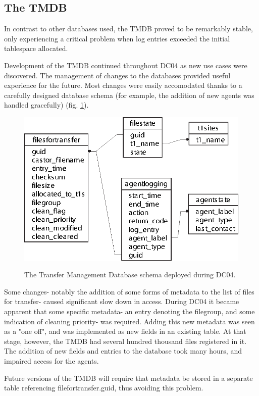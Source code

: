 \documentclass{cmspaper}
\begin{document}
\subsection{The TMDB}
In contrast to other databases used, the TMDB proved to be remarkably stable, only experiencing a critical problem when log entries exceeded the initial tablespace allocated.

Development of the TMDB continued throughout DC04 as new use cases were discovered. The management of changes to the databases provided useful experience for the future. Most changes were easily accomodated thanks to a carefully designed database schema (for example, the addition of new agents was handled gracefully) (fig. \ref{fig:schema}).

\begin{figure}[tbp]
\centering
\includegraphics{v1_tmdb.eps}
\label{fig:schema}
\caption{The Transfer Management Database schema deployed during DC04.}
\end{figure} 

Some changes- notably the addition of some forms of metadata to the list of files for transfer- caused significant slow down in access. During DC04 it became apparent that some specific metadata- an entry denoting the filegroup, and some indication of cleaning priority- was required. Adding this new metadata was seen as a "one off", and was implemented as new fields in an existing table. At that stage, however, the TMDB had several hundred thousand files registered in it. The addition of new fields and entries to the database took many hours, and impaired access for the agents.

Future versions of the TMDB will require that metadata be stored in a separate table referencing filefortransfer.guid, thus avoiding this problem.
\end{document}
